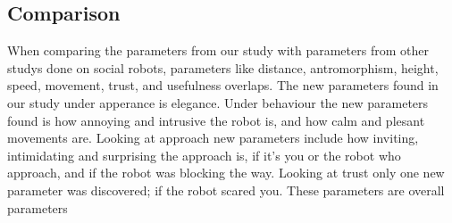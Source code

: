 \subsection{Comparison}
When comparing the parameters from our study with parameters from other studys done on social robots, parameters like distance, antromorphism, height, speed, movement, trust, and usefulness overlaps. The new parameters found in our study under apperance is elegance. Under behaviour the new parameters found is how annoying and intrusive the robot is, and how calm and plesant movements are. Looking at approach new parameters include how inviting, intimidating and surprising the approach is, if it's you or the robot who approach, and if the robot was blocking the way. Looking at trust only one new parameter was discovered; if the robot scared you. These parameters are overall parameters 